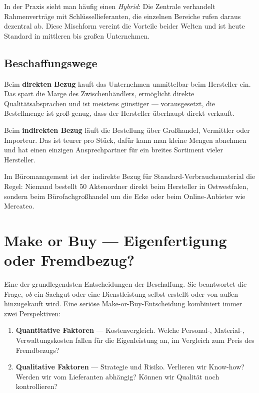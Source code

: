 \documentclass[11pt, a4paper]{article}
\begin{document}
\medskip
In der Praxis sieht man häufig einen \emph{Hybrid}: Die Zentrale verhandelt
Rahmenverträge mit Schlüssellieferanten, die einzelnen Bereiche rufen daraus dezentral
ab. Diese Mischform vereint die Vorteile beider Welten und ist heute Standard in
mittleren bis großen Unternehmen.

\subsection{Beschaffungswege}

Beim \textbf{direkten Bezug} kauft das Unternehmen unmittelbar beim Hersteller ein.
Das spart die Marge des Zwischenhändlers, ermöglicht direkte Qualitätsabsprachen und
ist meistens günstiger --- vorausgesetzt, die Bestellmenge ist groß genug, dass der
Hersteller überhaupt direkt verkauft.

Beim \textbf{indirekten Bezug} läuft die Bestellung über Großhandel, Vermittler oder
Importeur. Das ist teurer pro Stück, dafür kann man kleine Mengen abnehmen und hat
einen einzigen Ansprechpartner für ein breites Sortiment vieler Hersteller.

Im Büromanagement ist der indirekte Bezug für Standard-Verbrauchsmaterial die Regel:
Niemand bestellt 50 Aktenordner direkt beim Hersteller in Ostwestfalen, sondern beim
Bürofachgroßhandel um die Ecke oder beim Online-Anbieter wie Mercateo.

\section{Make or Buy --- Eigenfertigung oder Fremdbezug?}

Eine der grundlegendsten Entscheidungen der Beschaffung. Sie beantwortet die Frage,
\emph{ob} ein Sachgut oder eine Dienstleistung selbst erstellt oder von außen
hinzugekauft wird. Eine seriöse Make-or-Buy-Entscheidung kombiniert immer zwei
Perspektiven:

\begin{enumerate}
  \item \textbf{Quantitative Faktoren} --- Kostenvergleich. Welche Personal-, Material-,
    Verwaltungskosten fallen für die Eigenleistung an, im Vergleich zum Preis des
    Fremdbezugs?
  \item \textbf{Qualitative Faktoren} --- Strategie und Risiko. Verlieren wir Know-how?
    Werden wir vom Lieferanten abhängig? Können wir Qualität noch kontrollieren?
\end{enumerate}
\end{document}
